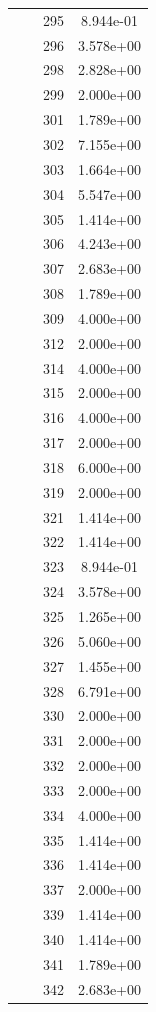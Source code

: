 \documentclass[12pt]{article}
\begin{document}
\begin{longtable}{@{}cccc@{}}
 &  & 295 & 8.944e-01 \\
 &  & 296 & 3.578e+00 \\
 &  & 298 & 2.828e+00 \\
 &  & 299 & 2.000e+00 \\
 &  & 301 & 1.789e+00 \\
 &  & 302 & 7.155e+00 \\
 &  & 303 & 1.664e+00 \\
 &  & 304 & 5.547e+00 \\
 &  & 305 & 1.414e+00 \\
 &  & 306 & 4.243e+00 \\
 &  & 307 & 2.683e+00 \\
 &  & 308 & 1.789e+00 \\
 &  & 309 & 4.000e+00 \\
 &  & 312 & 2.000e+00 \\
 &  & 314 & 4.000e+00 \\
 &  & 315 & 2.000e+00 \\
 &  & 316 & 4.000e+00 \\
 &  & 317 & 2.000e+00 \\
 &  & 318 & 6.000e+00 \\
 &  & 319 & 2.000e+00 \\
 &  & 321 & 1.414e+00 \\
 &  & 322 & 1.414e+00 \\
 &  & 323 & 8.944e-01 \\
 &  & 324 & 3.578e+00 \\
 &  & 325 & 1.265e+00 \\
 &  & 326 & 5.060e+00 \\
 &  & 327 & 1.455e+00 \\
 &  & 328 & 6.791e+00 \\
 &  & 330 & 2.000e+00 \\
 &  & 331 & 2.000e+00 \\
 &  & 332 & 2.000e+00 \\
 &  & 333 & 2.000e+00 \\
 &  & 334 & 4.000e+00 \\
 &  & 335 & 1.414e+00 \\
 &  & 336 & 1.414e+00 \\
 &  & 337 & 2.000e+00 \\
 &  & 339 & 1.414e+00 \\
 &  & 340 & 1.414e+00 \\
 &  & 341 & 1.789e+00 \\
 &  & 342 & 2.683e+00 \\

\end{longtable}
\end{document}
